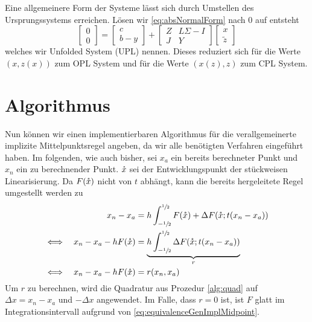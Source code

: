 Eine allgemeinere Form der Systeme lässt sich durch Umstellen des Ursprungssystems erreichen. Lösen wir \eqref{eq:absNormalForm} nach $0$ auf entsteht
 \begin{equation}
\label{eq:UPL}
  \begin{bmatrix}
   0\\0
  \end{bmatrix}
  =
  \begin{bmatrix}
   c\\b -y
  \end{bmatrix}
  +
  \begin{bmatrix}
   Z & L\Sigma - I \\
   J & Y
  \end{bmatrix}
  \begin{bmatrix}
   x\\ \tilde z
  \end{bmatrix}
 \end{equation}
welches wir Unfolded System (UPL) nennen. Dieses reduziert sich für die Werte $(x,z(x))$ zum OPL System und für die Werte $(x(z),z)$ zum CPL System.
\section{Algorithmus}
Nun können wir einen implementierbaren Algorithmus für die verallgemeinerte implizite Mittelpunktsregel angeben, da wir alle benötigten Verfahren eingeführt haben. Im folgenden, wie auch bisher, sei $x_a$ ein bereits berechneter Punkt und $ x_n$ ein zu berechnender Punkt. $\mathring{x}$ sei der Entwicklungspunkt der stückweisen Linearisierung. Da $F(\mathring{x})$ nicht von $t$ abhängt, kann die bereits hergeleitete Regel umgestellt werden zu 
\begin{equation}
\label{eq:genMidpointAlg}
\begin{aligned}
 &&  x_n -  x_a &= h\int_{-\sfrac{1}{2}}^{\sfrac{1}{2}}F(\mathring{x})+ \Delta F(\mathring{x};t(x_n - x_a)) \\
 \iff && x_n - x_a - hF(\mathring{x}) & =\underbrace{h \int_{-\sfrac{1}{2}}^{\sfrac{1}{2}} \Delta F(\mathring{x};t(x_n - x_a))}_{r} \\
 \iff && x_n - x_a - hF(\mathring{x}) & =r(x_n,x_a)
\end{aligned}
\end{equation}
Um $r$ zu berechnen, wird die Quadratur aus Prozedur \ref{alg:quad} auf $\Delta x = x_n - x_a$ und $-\Delta x$ angewendet. Im Falle, dass $r=0$ ist, ist $F$ glatt im Integrationsintervall aufgrund von \eqref{eq:equivalenceGenImplMidpoint}.

